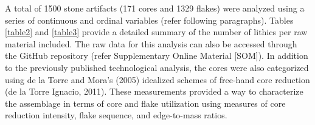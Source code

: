 \documentclass[]{elsarticle} %
\begin{document}
\begin{landscape}\begin{table}[!h]

\caption{\label{tab:flake prep}A summary of the flakes included in this analysis. \label{table3}}
\centering
{}
\end{table}
\end{landscape}

A total of 1500 stone artifacts (171 cores and 1329 flakes) were
analyzed using a series of continuous and ordinal variables (refer
following paragraphs). \hspace{0pt}Tables \ref{table2} and
\ref{table3}\hspace{0pt} provide a detailed summary of the number of
lithics per raw material included. The raw data for this analysis can
also be accessed through the GitHub repository (refer Supplementary
Online Material {[}SOM{]}). In addition to the previously published
technological analysis, the cores were also categorized using
\hspace{0pt}de la Torre and Mora's (2005)\hspace{0pt} idealized schemes
of free-hand core reduction (\hspace{0pt}de la Torre Ignacio,
2011\hspace{0pt}). These measurements provided a way to characterize the
assemblage in terms of core and flake utilization using measures of core
reduction intensity, flake sequence, and edge-to-mass ratios.
\end{document}
